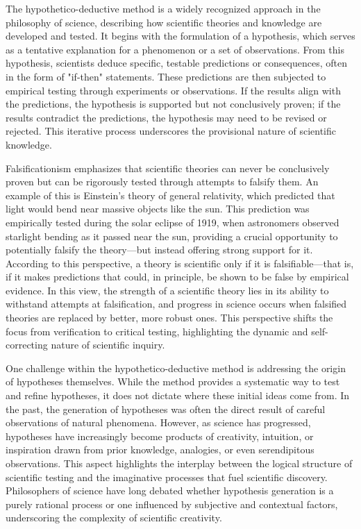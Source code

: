 The hypothetico-deductive method is a widely recognized approach in the philosophy of science, describing how scientific theories and knowledge are developed and tested. It begins with the formulation of a hypothesis, which serves as a tentative explanation for a phenomenon or a set of observations. From this hypothesis, scientists deduce specific, testable predictions or consequences, often in the form of "if-then" statements. These predictions are then subjected to empirical testing through experiments or observations. If the results align with the predictions, the hypothesis is supported but not conclusively proven; if the results contradict the predictions, the hypothesis may need to be revised or rejected. This iterative process underscores the provisional nature of scientific knowledge.

Falsificationism emphasizes that scientific theories can never be conclusively proven but can be rigorously tested through attempts to falsify them. An example of this is Einstein's theory of general relativity, which predicted that light would bend near massive objects like the sun. This prediction was empirically tested during the solar eclipse of 1919, when astronomers observed starlight bending as it passed near the sun, providing a crucial opportunity to potentially falsify the theory—but instead offering strong support for it. According to this perspective, a theory is scientific only if it is falsifiable—that is, if it makes predictions that could, in principle, be shown to be false by empirical evidence. In this view, the strength of a scientific theory lies in its ability to withstand attempts at falsification, and progress in science occurs when falsified theories are replaced by better, more robust ones. This perspective shifts the focus from verification to critical testing, highlighting the dynamic and self-correcting nature of scientific inquiry.

One challenge within the hypothetico-deductive method is addressing the origin of hypotheses themselves. While the method provides a systematic way to test and refine hypotheses, it does not dictate where these initial ideas come from. In the past, the generation of hypotheses was often the direct result of careful observations of natural phenomena. However, as science has progressed, hypotheses have increasingly become products of creativity, intuition, or inspiration drawn from prior knowledge, analogies, or even serendipitous observations. This aspect highlights the interplay between the logical structure of scientific testing and the imaginative processes that fuel scientific discovery. Philosophers of science have long debated whether hypothesis generation is a purely rational process or one influenced by subjective and contextual factors, underscoring the complexity of scientific creativity.

